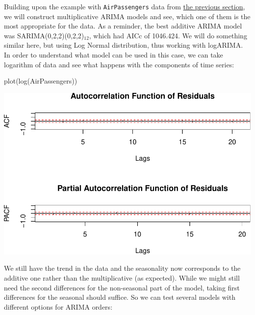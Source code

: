 \documentclass[
]{book}
\newenvironment{Shaded}{\begin{snugshade}}{\end{snugshade}}
\newcommand{\FunctionTok}[1]{\textcolor[rgb]{0.00,0.00,0.00}{#1}}
\newcommand{\NormalTok}[1]{#1}
\theoremstyle{definition}
\theoremstyle{definition}
\theoremstyle{definition}
\theoremstyle{definition}
\theoremstyle{remark}
\begin{document}
Building upon the example with \texttt{AirPassengers} data from \protect\hyperlink{ARIMAExampleInRSeasonal}{the previous section}, we will construct multiplicative ARIMA models and see, which one of them is the most appropriate for the data. As a reminder, the best additive ARIMA model was SARIMA(0,2,2)(0,2,2)\(_{12}\), which had AICc of 1046.424. We will do something similar here, but using Log Normal distribution, thus working with logARIMA. In order to understand what model can be used in this case, we can take logarithm of data and see what happens with the components of time series:

\begin{Shaded}
\begin{Highlighting}[]
\FunctionTok{plot}\NormalTok{(}\FunctionTok{log}\NormalTok{(AirPassengers))}
\end{Highlighting}
\end{Shaded}

\includegraphics{adam_files/figure-latex/unnamed-chunk-72-1.pdf}

We still have the trend in the data and the seasonality now corresponds to the additive one rather than the multiplicative (as expected). While we might still need the second differences for the non-seasonal part of the model, taking first differences for the seasonal should suffice. So we can test several models with different options for ARIMA orders:
\end{document}
